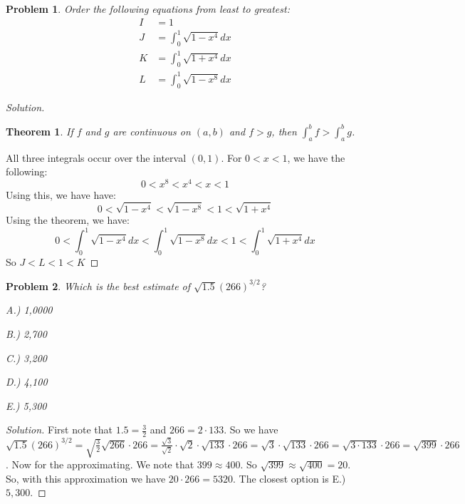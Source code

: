 \documentclass[12pt,oneside]{book}
\theoremstyle{mystyle}
\newtheorem{problem}{Problem}[section]
\newtheorem*{theorem*}{Theorem}
\begin{document}
\begin{problem}
Order the following equations from least to greatest:
\begin{align}
    \nonumber I &= 1 \\
    \nonumber J &= \int_{0}^{1}\sqrt{1-x^4}dx \\
    \nonumber K &= \int_{0}^{1}\sqrt{1+x^4}dx \\
    \nonumber L &= \int_{0}^{1}\sqrt{1-x^8}dx
\end{align}
\end{problem}
\begin{proof}[Solution]
\begin{theorem*}
If $f$ and $g$ are continuous on $(a,b)$ and $f>g$, then $\int_{a}^{b}f > \int_{a}^{b} g$.
\end{theorem*}
All three integrals occur over the interval $(0,1)$. For $0 < x < 1$, we have the following:
\begin{equation}
    \nonumber 0 < x^8 < x^4 < x < 1
\end{equation}
Using this, we have have:
\begin{equation}
    \nonumber 0 < \sqrt{1-x^4} < \sqrt{1-x^8} < 1 < \sqrt{1+x^4}
\end{equation}
Using the theorem, we have:
\begin{equation}
    \nonumber 0 < \int_{0}^{1}\sqrt{1-x^4}dx < \int_{0}^{1}\sqrt{1-x^8}dx < 1 < \int_{0}^{1}\sqrt{1+x^4}dx
\end{equation}
So $J < L < 1 < K$
\end{proof}

\begin{problem}
Which is the best estimate of $\sqrt{1.5}(266)^{3/2}$?
\begin{enumerate}
    \begin{multicols}{5}
    \item[A.)] 1,0000
    \item[B.)] 2,700
    \item[C.)] 3,200
    \item[D.)] 4,100
    \item[E.)] 5,300
    \end{multicols}
\end{enumerate}
\end{problem}
\begin{proof}[Solution]
First note that $1.5 = \frac{3}{2}$ and $266 = 2\cdot 133$. So we have $\sqrt{1.5}(266)^{3/2} = \sqrt{\frac{3}{2}}\sqrt{266}\cdot 266 = \frac{\sqrt{3}}{\sqrt{2}}\cdot \sqrt{2}\cdot \sqrt{133}\cdot 266 = \sqrt{3}\cdot \sqrt{133}\cdot 266 = \sqrt{3\cdot 133}\cdot 266 = \sqrt{399}\cdot 266$. Now for the approximating. We note that $399 \approx 400$. So $\sqrt{399} \approx \sqrt{400} = 20$. So, with this approximation we have $20\cdot 266 = 5320$. The closest option is E.) $5,300$.
\end{proof}
\end{document}
